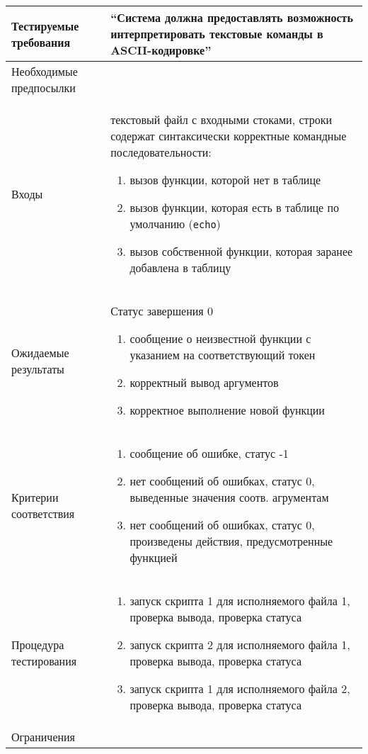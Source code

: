 \documentclass[a4paper, 12pt]{article}
\begin{document}
\begin{table}[H]
	\centering
	\begin{tabular}{|l|p{4in}|}
		\hline
		Тестируемые требования	&``Система должна предоставлять возможность интерпретировать текстовые
		команды в ASCII-кодировке''\\
		\hline
		Необходимые предпосылки	&\\
		\hline
		Входы			&текстовый файл с входными стоками,\newline
		строки содержат синтаксически корректные командные последовательности:
		\begin{enumerate}
			\item вызов функции, которой нет в таблице
			\item вызов функции, которая есть в таблице по умолчанию ({\tt echo})
			\item вызов собственной функции, которая заранее добавлена в таблицу
		\end{enumerate}\\
		\hline
		Ожидаемые результаты	&Статус завершения 0\newline
		\begin{enumerate}
			\item сообщение о неизвестной функции с указанием на соответствующий токен
			\item корректный вывод аргументов
			\item корректное выполнение новой функции
		\end{enumerate}
		\\
		\hline
		Критерии соответствия	& \begin{enumerate}
			\item сообщение об ошибке, статус -1
			\item нет сообщений об ошибках, статус 0, выведенные значения соотв. агрументам
			\item нет сообщений об ошибках, статус 0, произведены действия, предусмотренные функцией
		\end{enumerate}
		\\
		\hline
		Процедура тестирования	&
		\begin{enumerate}
			\item запуск скрипта 1 для исполняемого файла 1, проверка вывода, проверка статуса
			\item запуск скрипта 2 для исполняемого файла 1, проверка вывода, проверка статуса
			\item запуск скрипта 1 для исполняемого файла 2, проверка вывода, проверка статуса
		\end{enumerate}\\
		\hline
		Ограничения		&\\
		\hline
	\end{tabular}
\end{table}
\end{document}

